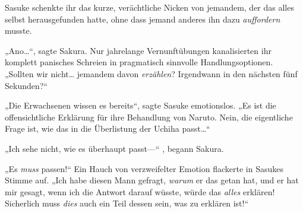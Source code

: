 Sasuke schenkte ihr das kurze, verächtliche Nicken von jemandem, der das alles selbst herausgefunden hatte, ohne dass jemand anderes ihn dazu \emph{auffordern} musste.

„Ano…“, sagte Sakura. Nur jahrelange Vernunftübungen kanalisierten ihr komplett panisches Schreien in pragmatisch sinnvolle Handlungsoptionen. „Sollten wir nicht… jemandem davon \emph{erzählen}? Irgendwann in den nächsten fünf Sekunden?“

„Die Erwachsenen wissen es bereits“, sagte Sasuke emotionslos. „Es ist die offensichtliche Erklärung für ihre Behandlung von Naruto. Nein, die eigentliche Frage ist, wie das in die Überlistung der Uchiha passt…“

„Ich sehe nicht, wie es überhaupt passt—“ , begann Sakura.

„Es \emph{muss} passen!“ Ein Hauch von verzweifelter Emotion flackerte in Sasukes Stimme auf. „Ich habe diesen Mann gefragt, \emph{warum} er das getan hat, und er hat mir gesagt, wenn ich die Antwort darauf wüsste, würde das \emph{alles} erklären! Sicherlich muss \emph{dies} auch ein Teil dessen sein, was zu erklären ist!“

